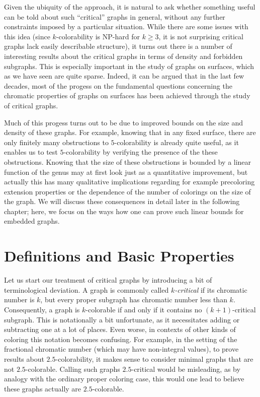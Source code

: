 \documentclass[12pt,twoside,openright,a4paper]{book}
\begin{document}
Given the ubiquity of the approach, it is natural to ask whether something 
useful can be told about such ``critical'' graphs in general, without any further
constraints imposed by a particular situation.  While there are some issues
with this idea (since $k$-colorability is NP-hard for $k\ge 3$, it is not surprising
critical graphs lack easily describable structure), it turns out there is a number
of interesting results about the critical graphs in terms of density and forbidden subgraphs.
This is especially important in the study of graphs on surfaces, which as we have
seen are quite sparse.  Indeed, it can be argued that in the last few decades,
most of the progess on the fundamental questions concerning the chromatic properties
of graphs on surfaces has been achieved through the study of critical graphs.

Much of this progess turns out to be due to improved bounds
on the size and density of these graphs.  For example, knowing that in any
fixed surface, there are only finitely many obstructions to $5$-colorability
is already quite useful, as it enables us to test $5$-colorability by verifying the
presence of the these obstructions.  Knowing that the size of these obstructions
is bounded by a linear function of the genus may at first look just as a quantitative improvement,
but actually this has many qualitative implications regarding for example precoloring extension
properties or the dependence of the number of colorings on the size of the graph.
We will discuss these consequences in detail later in the following chapter;
here, we focus on the ways how one can prove such linear bounds for embedded graphs.

\section{Definitions and Basic Properties}\label{sec:defbas}

Let us start our treatment of critical graphs by introducing a bit of terminological
deviation.  A graph is commonly called \emph{$k$-critical} if its chromatic number is $k$, but every
proper subgraph has chromatic number less than $k$.  Consequently, a graph is $k$-colorable
if and only if it contains no $(k+1)$-critical subgraph.  This is notationally a bit unfortunate,
as it necessitates adding or subtracting one at a lot of places.  Even worse, in contexts
of other kinds of coloring this notation becomes confusing.  For example, in the setting
of the fractional chromatic number (which may have non-integral values), to prove results
about $2.5$-colorability, it makes sense to consider minimal graphs that are not $2.5$-colorable.
Calling such graphs $2.5$-critical would be misleading, as by analogy with the ordinary
proper coloring case, this would one lead to believe these graphs actually are $2.5$-colorable.
\end{document}
